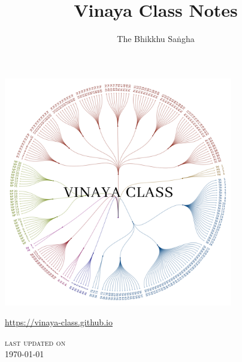 \documentclass[11pt]{memoir}
\title{Vinaya Class Notes}
\author{The Bhikkhu Saṅgha}
\begin{document}
\frontmatter

\vspace*{-2cm}

{\centering%

\includegraphics[width=10cm]{../../src/includes/figures/vinaya-class-title.w1800.png}

\href{https://vinaya-class.github.io}{https://vinaya-class.github.io}

{\scshape\small last updated on}\\
\today

}

\tableofcontents*



\mainmatter



























\backmatter



% 

% 
\end{document}
